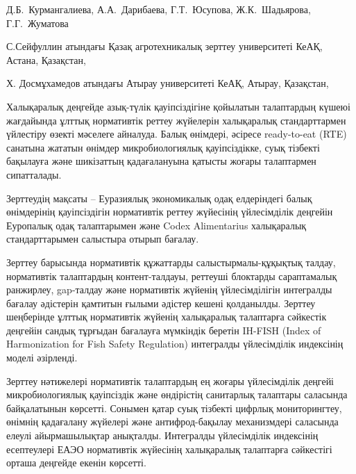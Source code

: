 
\begin{header}

Д.Б.~Курмангалиева,
А.А.~Дарибаева,
Г.Т.~Юсупова\envelope,
Ж.К.~Шадьярова,
Г.Г.~Жуматова
\end{header}

\begin{affil}
С.Сейфуллин атындағы Қазақ агротехникалық зерттеу университеті КеАҚ, Астана, Қазақстан,

Х. Досмұхамедов атындағы Атырау университеті КеАҚ, Атырау, Қазақстан,

\end{affil}

Халықаралық деңгейде азық-түлік қауіпсіздігіне қойылатын талаптардың
күшеюі жағдайында ұлттық нормативтік реттеу жүйелерін халықаралық
стандарттармен үйлестіру өзекті мәселеге айналуда. Балық өнімдері,
әсіресе ready-to-eat (RTE) санатына жататын өнімдер микробиологиялық
қауіпсіздікке, суық тізбекті бақылауға және шикізаттың қадағалануына
қатысты жоғары талаптармен сипатталады.

Зерттеудің мақсаты -- Еуразиялық экономикалық одақ елдеріндегі балық
өнімдерінің қауіпсіздігін нормативтік реттеу жүйесінің үйлесімділік
деңгейін Еуропалық одақ талаптарымен және Codex Alimentarius халықаралық
стандарттарымен салыстыра отырып бағалау.

Зерттеу барысында нормативтік құжаттарды салыстырмалы-құқықтық талдау,
нормативтік талаптардың контент-талдауы, реттеуші блоктарды сараптамалық
ранжирлеу, gap-талдау және нормативтік жүйенің үйлесімділігін интегралды
бағалау әдістерін қамтитын ғылыми әдістер кешені қолданылды. Зерттеу
шеңберінде ұлттық нормативтік жүйенің халықаралық талаптарға сәйкестік
деңгейін сандық тұрғыдан бағалауға мүмкіндік беретін IH-FISH (Index of
Harmonization for Fish Safety Regulation) интегралды үйлесімділік
индексінің моделі әзірленді.

Зерттеу нәтижелері нормативтік талаптардың ең жоғары үйлесімділік
деңгейі микробиологиялық қауіпсіздік және өндірістің санитарлық
талаптары саласында байқалатынын көрсетті. Сонымен қатар суық тізбекті
цифрлық мониторингтеу, өнімнің қадағалану жүйелері және антифрод-бақылау
механизмдері саласында елеулі айырмашылықтар анықталды. Интегралды
үйлесімділік индексінің есептеулері ЕАЭО нормативтік жүйесінің
халықаралық талаптарға сәйкестігі орташа деңгейде екенін көрсетті.

